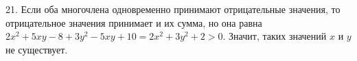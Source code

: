21. Если оба многочлена одновременно принимают отрицательные значения, то отрицательное значения принимает и их сумма, но она равна $2x^2+5xy-8+3y^2-5xy+10=
2x^2+3y^2+2>0.$ Значит, таких значений $x$ и $y$ не существует.\\
